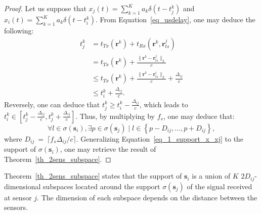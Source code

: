 \documentclass[journal]{IEEEtran}
\newcommand{\vect}[1]{\bm{#1}}
\newcommand{\ser}[2]{#1^{#2}}
\theoremstyle{definition}
\begin{document}
\begin{proof}
	Let us suppose that $x_j \left(t\right) = \sum_{k=1}^{K} a_k \delta \left(t - \ser{t_j}{k}\right)$ and $x_i \left(t\right) = \sum_{k=1}^{K} a_k \delta \left(t - \ser{t_i}{k}\right)$. From Equation~\eqref{eq_usdelay}, one may deduce the following:
	\begin{align*}
	\ser{t_j}{k} &= t_{Tx}\left(\vect{r}^k\right) + t_{Rx}\left(\vect{r}^k, \ser{\vect{r}_{ts}}{j}\right) \\
	&= t_{Tx}\left(\vect{r}^k\right) + \frac{\|\vect{r}^k - \ser{\vect{r}_{ts}}{j} \|_2}{c}\\
	&\leq  t_{Tx}\left(\vect{r}^k\right) + \frac{\|\vect{r}^k - \ser{\vect{r}_{ts}}{i} \|_2}{c} + \frac{\Delta_{ij}}{c}\\
	&\leq \ser{t_i}{k} + \frac{\Delta_{ij}}{c}.
	\end{align*}
	Reversely, one can deduce that $\ser{t_j}{k} \geq \ser{t_i}{k} - \frac{\Delta_{ij}}{c}$, which leads to $\ser{t_i}{k} \in \left[\ser{t_j}{k} -\frac{\Delta_{ij}}{c}, \ser{t_j}{k} +\frac{\Delta_{ij}}{c}\right]$. Thus, by multiplying by $f_s$, one may deduce that:
	\begin{equation}
	\label{eq_1_support_x_xj}
		\forall l \in \sigma\left(\vect{s}_i\right), \exists p \in \sigma \left(\vect{s}_j\right) \; | \; l \in \left\lbrace p-D_{ij},\dots,p+D_{ij}\right\rbrace,
	\end{equation}
	where $D_{ij}~=~\lceil f_s \Delta_{ij}/ c  \rceil$. Generalizing Equation~\eqref{eq_1_support_x_xj} to the support of $\sigma\left(\vect{s}_i\right)$, one may retrieve the result of Theorem~\ref{th_2sens_subspace}.
\end{proof}
Theorem~\ref{th_2sens_subspace} states that the support of $\vect{s}_i$ is a union of $K$ \num{2}$D_{ij}$-dimensional subspaces located around the support $\sigma \left(\vect{s}_j\right)$ of the signal received at sensor $j$. The dimension of each subspace depends on the distance between the sensors. 
\end{document}
